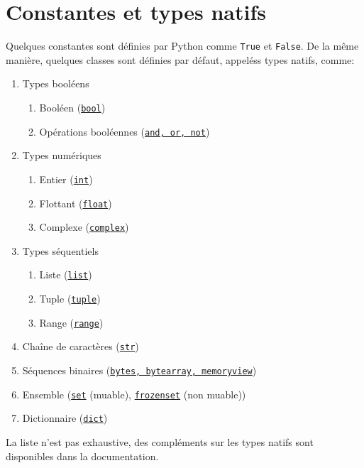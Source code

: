 \documentclass[a4paper, 10pt]{article}
\newcommand{\code}[1]{{\small\texttt{#1}}}
\begin{document}
\section{Constantes et types natifs}
 Quelques constantes sont définies par Python comme \code{True}\index{\code{True}} et \code{False}\index{\code{False}}. De la même manière, quelques classes sont définies par défaut, appeléss types natifs, comme:
\begin{enumerate}
		\item Types booléens
		\begin{enumerate}
			\item Booléen (\href{https://docs.python.org/fr/3/library/functions.html?highlight=bool#bool}{\code{bool}})
			\item Opérations booléennes (\href{https://docs.python.org/fr/3/library/stdtypes.html#boolean-operations-and-or-not}{\code{and, or, not}})
		\end{enumerate}
        \item Types numériques
        \begin{enumerate}
              \item Entier (\href{https://docs.python.org/fr/3/library/stdtypes.html#typesnumeric}{\code{int}})
              \item Flottant (\href{https://docs.python.org/fr/3/library/stdtypes.html#typesnumeric}{\code{float}})
              \item Complexe (\href{https://docs.python.org/fr/3/library/stdtypes.html#typesnumeric}{\code{complex}})
      \end{enumerate}
     \item Types séquentiels
	\begin{enumerate}
       \item Liste (\href{https://docs.python.org/fr/3/library/stdtypes.html#sequence-types-list-tuple-range}{\code{list}})
		\item Tuple (\href{https://docs.python.org/fr/3/library/stdtypes.html#sequence-types-list-tuple-range}{\code{tuple}})
		\item Range (\href{https://docs.python.org/fr/3/library/stdtypes.html#sequence-types-list-tuple-range}{\code{range}})
	\end{enumerate}
        \item Chaîne de caractères (\href{https://docs.python.org/fr/3/library/string.html?highlight=str#module-string}{\code{str}})
		\item Séquences binaires (\href{https://docs.python.org/fr/3/library/stdtypes.html#binary-sequence-types-bytes-bytearray-memoryview}{\code{bytes, bytearray, memoryview}})
		\item Ensemble (\href{https://docs.python.org/fr/3/library/stdtypes.html#set-types-set-frozenset}{\code{set}} (muable), \href{https://docs.python.org/fr/3/library/stdtypes.html#set-types-set-frozenset}{\code{frozenset}} (non muable))
		\item Dictionnaire (\href{https://docs.python.org/fr/3/library/stdtypes.html#mapping-types-dict}{\code{dict}})
\end{enumerate}
La liste n'est pas exhaustive, des compléments sur les types natifs sont disponibles dans la documentation.
\end{document}
